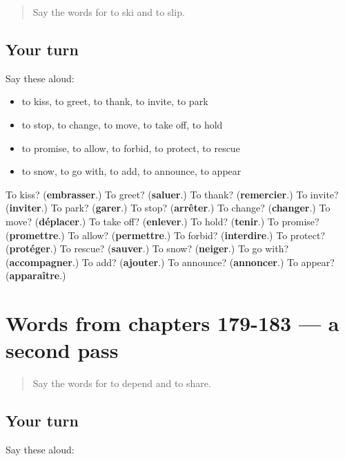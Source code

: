 \begin{quote}
Say the words for to ski and to slip.
\end{quote}

\subsection*{Your turn}
Say these aloud:

\begin{itemize}
\raggedright
  \item to kiss, to greet, to thank, to invite, to park
  \item to stop, to change, to move, to take off, to hold
  \item to promise, to allow, to forbid, to protect, to rescue
  \item to snow, to go with, to add, to announce, to appear
\end{itemize}

\begin{tcolorbox}[breakable,colback=teal!4,colframe=teal!35!black,title={Before you move on}]
To kiss? (\textbf{embrasser}.) To greet? (\textbf{saluer}.) To thank? (\textbf{remercier}.) To invite? (\textbf{inviter}.) To park? (\textbf{garer}.) To stop? (\textbf{arrêter}.) To change? (\textbf{changer}.) To move? (\textbf{déplacer}.) To take off? (\textbf{enlever}.) To hold? (\textbf{tenir}.) To promise? (\textbf{promettre}.) To allow? (\textbf{permettre}.) To forbid? (\textbf{interdire}.) To protect? (\textbf{protéger}.) To rescue? (\textbf{sauver}.) To snow? (\textbf{neiger}.) To go with? (\textbf{accompagner}.) To add? (\textbf{ajouter}.) To announce? (\textbf{annoncer}.) To appear? (\textbf{apparaître}.)
\end{tcolorbox}
\section[(dialogue)]{Words from chapters 179-183 — a second pass}

\label{lesson:FR-R183-second-pass-words-from-chapters-179-183}



\begin{quote}
Say the words for to depend and to share.
\end{quote}

\subsection*{Your turn}
Say these aloud:

